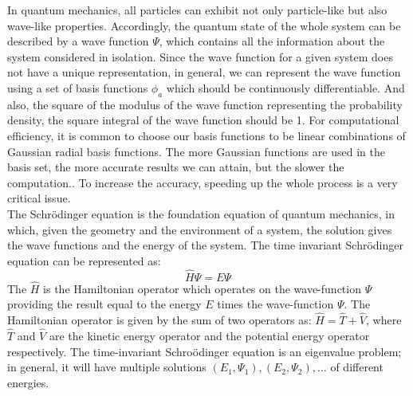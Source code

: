 \documentclass[twoside,11pt]{article}
\begin{document}
In quantum mechanics, all particles can exhibit not only particle-like but also wave-like properties. Accordingly, the quantum state of the whole system can be described by a wave function $\Psi$, which contains all the information about the system considered in isolation. Since the wave function for a given system does not have a unique representation, in general, we can represent the wave function using a set of basis functions $\phi_a$ which should be continuously differentiable. And also, the square of the modulus of the wave function representing the probability density, the square integral of the wave function should be 1.
For computational efficiency, it is common to choose our basis functions to be linear combinations of Gaussian radial basis functions.
The more Gaussian functions are used in the basis set, the more accurate results we can attain, but the slower the computation.. To increase the accuracy, speeding up the whole process is a very critical issue. \\






The Schr\"{o}dinger equation is the foundation equation of quantum mechanics, in which, given the geometry and the environment of a system, the solution gives the wave functions and the energy of the system. 
The time invariant Schr\"{o}dinger equation can be represented as:
\[
				\hat{H}\Psi = E\Psi
\]
The $\hat{H}$ is the Hamiltonian operator which operates on the wave-function $\Psi$ providing the result equal to the energy $E$ times the wave-function $\Psi$. The Hamiltonian operator is given by the sum of two operators as: $\hat{H} = \hat{T} + \hat{V}$,  where $\hat{T}$ and $\hat{V}$ are the kinetic energy operator and the potential energy operator respectively. 
The time-invariant Schro\"{o}dinger equation is an eigenvalue problem; in general, it will have multiple solutions $(E_1, \Psi_1), (E_2,\Psi_2), \ldots$ of different energies.  
\end{document}

